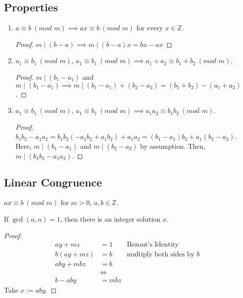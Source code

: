 \documentclass{report}
\newcommand{\Z}{\mathbb{Z}}
\newcommand{\proposition}[1]{\begin{tcolorbox}[title=\textit{Proposition}]{#1}\end{tcolorbox}}
\renewcommand{\mod}[1]{\ (\textit{mod } {#1})}
\begin{document}
\subsection{Properties}
\begin{enumerate}[label=\textit{(\roman*)}]
    \item $a \equiv b \mod{m} \implies ax \equiv b \mod{m}$ for every $x \in \Z$.
        \begin{proof}
            $m \mid (b - a) \implies m \mid (b - a)x = bx - ax$
        \end{proof}
    \item $a_1 \equiv b_1 \mod{m}$, $a_1 \equiv b_1 \mod{m} \implies a_1 + a_2 \equiv b_1 + b_2 \mod{m}$.
        \begin{proof}
            $m \mid (b_1 - a_1)$ and $m \mid (b_1 - a_1) \implies m \mid (b_1 - a_1) + (b_2 - a_2) 
            = (b_1 + b_2) - (a_1 + a_2)$.
            \newline
            \newline
        \end{proof}
    \item $a_1 \equiv b_1 \mod{m}$, $a_1 \equiv b_1 \mod{m} \implies a_1 a_2 \equiv b_1 b_2 \mod{m}$.
        \begin{proof}
            $b_1 b_2 - a_1 a_2 = b_1 b_2 (- a_1 b_2 + a_1 b_2) + a_1 a_2 = (b_1 - a_1) b_2 + a_1 (b_2 - a_2)$.
            Here, $m \mid (b_1 - a_1)$ and $m \mid (b_2 - a_2)$ by assumption. Then, $m \mid (b_1 b_2 - a_1 a_2)$.
        \end{proof}
\end{enumerate}


\subsection{Linear Congruence}
$ax \equiv b \mod{m}$ for $m > 0$, $a, b \in \Z$.

\proposition {
    If $\gcd(a, n) = 1$, then there is an integer solution $x$.
}
\begin{proof}
    \begin{align*}
        ay + mz &= 1 & \text{Bezout's Identity} \\
        b(ay + mz) &= b & \text{multiply both sides by } b \\
        aby + mbz &= b \\
                  &\iff \\
        b - aby &= mbz
    \end{align*}
    Take $x := aby$.
\end{proof}
\end{document}
